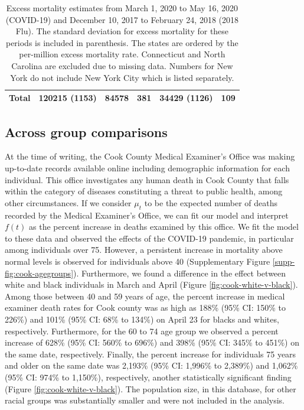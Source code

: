 \documentclass[11pt]{article}
\begin{document}
\begin{table}
\begin{tabular}{|l|lll|ll|}
 \hline
  Total & 120215 (1153) & 84578 & 381 & 34429 (1126) & 109 \\ 
  \hline
 \end{tabular}
 \caption{Excess mortality estimates from March 1, 2020 to May 16, 2020 (COVID-19) and  December 10, 2017 to February 24, 2018 (2018 Flu). The standard deviation for excess mortality for these periods is included in parenthesis. The states are ordered by the per-million excess mortality rate. Connecticut and North Carolina are excluded due to missing data. Numbers for New York do not include New York City which is listed separately.}
 \label{tab:covid19-states}
 \normalsize
\end{table}
 
\subsection{Across group comparisons}
\label{subsec:group-comparison}
At the time of writing, the Cook County Medical Examiner's Office was making up-to-date records available online including demographic information for each individual. This office investigates any human death in Cook County that falls within the category of diseases constituting a threat to public health, among other circumstances\cite{cookcovid19}. If we consider $\mu_t$ to be the expected number of deaths recorded by the Medical Examiner's Office, we can fit our model and interpret $f(t)$ as the percent increase in deaths examined by this office. We fit the model to these data and observed the effects of the COVID-19 pandemic, in particular among individuals over 75. However, a persistent increase in mortality above normal levels is observed for individuals above 40 (Supplementary Figure \ref{supp-fig:cook-agegroups}). Furthermore, we found a difference in the effect between white and black individuals in March and April (Figure \ref{fig:cook-white-v-black}). Among those between 40 and 59 years of age, the percent increase in medical examiner death rates for Cook county was as high as 188\% (95\% CI: 150\% to 226\%) and 101\% (95\% CI: 68\% to 134\%) on April 23 for blacks and whites, respectively. Furthermore, for the 60 to 74 age group we observed a percent increase of 628\% (95\% CI: 560\% to 696\%) and 398\% (95\% CI: 345\% to 451\%) on the same date, respectively. Finally, the percent increase for individuals 75 years and older on the same date was 2,193\% (95\% CI: 1,996\% to 2,389\%) and 1,062\% (95\% CI: 974\% to  1,150\%), respectively, another statistically significant finding (Figure \ref{fig:cook-white-v-black}). The population size, in this database, for other racial groups was substantially smaller and were not included in the analysis.
\end{document}
